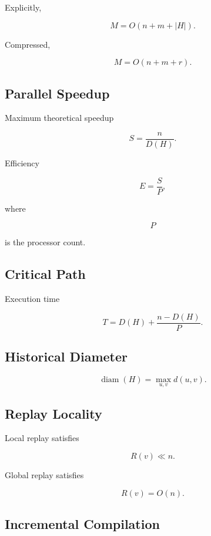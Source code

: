 \documentclass[12pt,oneside]{article}
\theoremstyle{definition}
\theoremstyle{remark}
\begin{document}
Explicitly,

\[
M
=
O(n+m+|H|).
\]

Compressed,

\[
M
=
O(n+m+r).
\]

\subsection*{Parallel Speedup}

Maximum theoretical speedup

\[
S
=
\frac{n}{D(H)}.
\]

Efficiency

\[
E
=
\frac{S}{P},
\]

where

\[
P
\]

is the processor count.

\subsection*{Critical Path}

Execution time

\[
T
=
D(H)
+
\frac{n-D(H)}{P}.
\]

\subsection*{Historical Diameter}

\[
\operatorname{diam}(H)
=
\max_{u,v}
d(u,v).
\]

\subsection*{Replay Locality}

Local replay satisfies

\[
R(v)
\ll
n.
\]

Global replay satisfies

\[
R(v)
=
O(n).
\]

\subsection*{Incremental Compilation}
\end{document}
